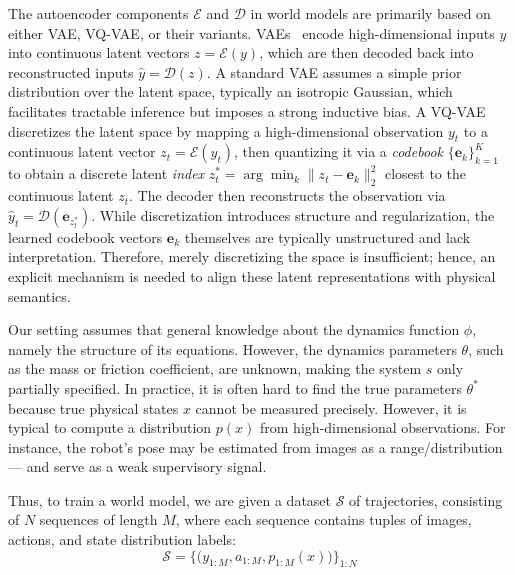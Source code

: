 \documentclass[sigconf]{acmart}
\begin{document}
 
The autoencoder components $\mathcal{E}$ and $\mathcal{D}$ in world models are primarily based on either VAE, VQ-VAE, or their variants. VAEs~\cite[]{kingma2013auto} encode high-dimensional inputs \( y \) into continuous latent vectors \( z = \mathcal{E}(y) \), which are then decoded back into reconstructed inputs \( \hat{y} = \mathcal{D}(z) \). A standard VAE assumes a simple prior distribution over the latent space, typically an isotropic Gaussian, which facilitates tractable inference but imposes a strong inductive bias.  A VQ-VAE~\cite[]{van2017neural} discretizes the latent space by mapping a high-dimensional observation \( y_t \) to a continuous latent vector \( z_t = \mathcal{E}(y_t) \), then quantizing it via a \textit{codebook} \( \{\mathbf{e}_k\}_{k=1}^K \) to obtain a discrete latent \textit{index} \( z_t^* = \arg\min_k \|z_t - \mathbf{e}_k\|_2^2 \) closest to the continuous latent $z_t$. The decoder then reconstructs the observation via \( \hat{y}_t = \mathcal{D}(\mathbf{e}_{z_t^*}) \). While discretization introduces structure and regularization, the learned codebook vectors \( \mathbf{e}_k \) themselves are typically unstructured and lack interpretation.  Therefore, merely discretizing the space is insufficient; hence, an explicit mechanism is needed to align these latent representations with physical semantics.



Our setting assumes that general knowledge about the dynamics function \( \phi \), namely the structure of its equations. However, the dynamics parameters \( \theta \), such as the mass or friction coefficient, are unknown, making the system $s$ only partially specified. In practice, it is often hard to find the true parameters $\theta^*$ because true physical states $x$ cannot be measured precisely. However, it is typical to compute a distribution $p(x)$ from high-dimensional observations. For instance, the robot's pose may be estimated from images as a range/distribution --- and serve as a weak supervisory signal.

Thus, to train a world model, we are given a dataset \( \mathcal{S} \) of trajectories, consisting of \( N \) sequences of length \( M \), where each sequence contains tuples of images, actions, and state distribution labels:
\begin{equation}
 \mathcal{S} = \Big\{ \big(y_{1:M}, a_{1:M}, p_{1:M}(x) \big) \Big\}_{1:N}
\end{equation}
\end{document}
